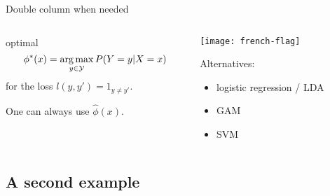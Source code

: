 \begin{frame}{Double column when needed}
	\begin{columns}
		\begin{column}[T]{.48\textwidth}
			 optimal
			\begin{equation*}
				\phi^*(x) = \operatorname*{arg\,max}_{y\in \mathcal{Y}} P(Y=y|X=x)
			\end{equation*}
			for the loss  $l(y,y')=1_{y\neq y'}$.

			\vspace{1cm}

			One can always use  $\widehat{\phi}(x)$.
		\end{column}
		\begin{column}[T]{.48\textwidth}
			\centering
			\texttt{[image: french-flag]}

			\vspace{1cm}

			Alternatives:
			\begin{itemize}
				\item logistic regression / LDA
				\item GAM
				\item SVM
			\end{itemize}
			\vspace{1cm}

		\end{column}
	\end{columns}
\end{frame}

\subsection{A second example}
\label{sub:deuxiem_exmple}



